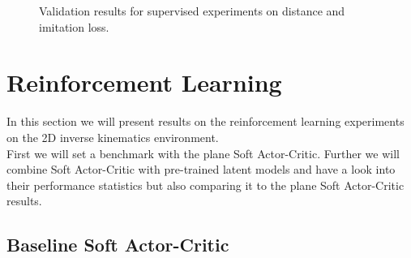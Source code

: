 \begin{figure}[h]
    \begin{center}
        \hfill
    \end{center}
    \caption[Supervised Distance and Imitation Loss]{Validation results for supervised experiments on distance and imitation loss. }
    \label{fig:supervised_imitation}
\end{figure}

\section{Reinforcement Learning}

In this section we will present results on the reinforcement learning experiments on the 2D inverse kinematics environment. \\
First we will set a benchmark with the plane Soft Actor-Critic. Further we will combine Soft Actor-Critic with pre-trained latent models and have a look into their performance statistics but also comparing it to the plane Soft Actor-Critic results. 

\subsection{Baseline Soft Actor-Critic}

